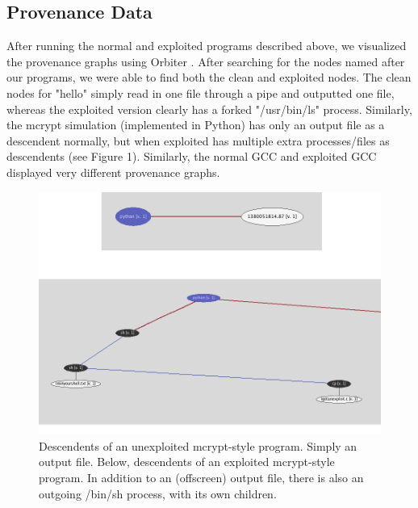 \documentclass[10pt,twocolumn]{article}
\begin{document}
\subsection{Provenance Data}
After running the normal and exploited programs described above, we visualized the provenance graphs using Orbiter \cite{orbiter}. After searching for the nodes named after our programs, we were able to find both the clean and exploited nodes. The clean nodes for "hello" simply read in one file through a pipe and outputted one file, whereas the exploited version clearly has a forked "/usr/bin/ls" process. Similarly, the mcrypt simulation (implemented in Python) has only an output file as a descendent normally, but when exploited has multiple extra processes/files as descendents (see Figure 1). Similarly, the normal GCC and exploited GCC displayed very different provenance graphs. 
\begin{figure}
  \caption{Descendents of an unexploited mcrypt-style program. Simply an output file. Below, descendents of an exploited mcrypt-style program. In addition to an (offscreen) output file, there is also an outgoing /bin/sh process, with its own children.}
  \centering
    \includegraphics[width=\textwidth]{img/mcrypt.png}
\end{figure}
\end{document}
